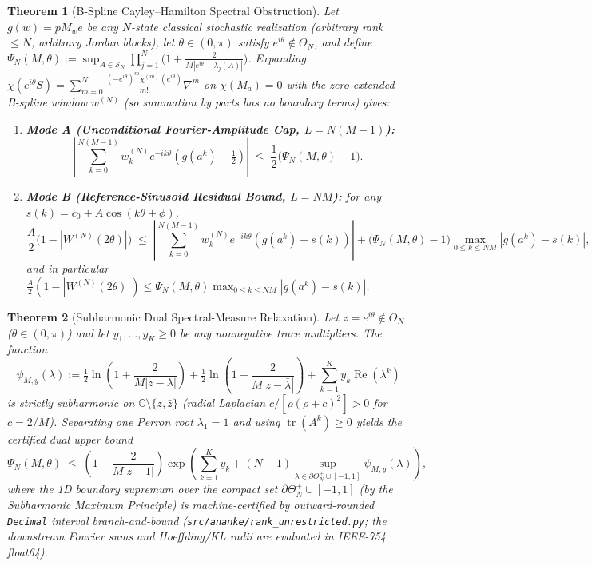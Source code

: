 \documentclass[11pt]{article}
\newtheorem{theorem}{Theorem}
\theoremstyle{definition}
\newcommand{\C}{\mathbb{C}}
\newcommand{\Tr}{\operatorname{tr}}
\begin{document}
\begin{theorem}[B-Spline Cayley--Hamilton Spectral Obstruction]\label{thm:bspline}
Let $g(w)=pM_w e$ be \emph{any} $N$-state classical stochastic realization (arbitrary rank $\le N$, arbitrary Jordan blocks), let $\theta\in(0,\pi)$ satisfy $e^{i\theta}\notin\Theta_N$, and define $\Psi_N(M,\theta):=\sup_{A\in\mathcal{S}_N}\prod_{j=1}^N\bigl(1+\frac{2}{M|e^{i\theta}-\lambda_j(A)|}\bigr)$. Expanding $\chi(e^{i\theta}S)=\sum_{m=0}^N\frac{(-e^{i\theta})^m\chi^{(m)}(e^{i\theta})}{m!}\nabla^m$ on $\chi(M_a)=0$ with the zero-extended B-spline window $w^{(N)}$ (so summation by parts has no boundary terms) gives:
\begin{enumerate}
\item \textbf{Mode A (Unconditional Fourier-Amplitude Cap, $L=N(M-1)$):}
\[
 \left|\sum_{k=0}^{N(M-1)} w^{(N)}_k e^{-ik\theta}\!\left(g(a^k)-\tfrac{1}{2}\right)\right| \;\le\; \frac{1}{2}\bigl(\Psi_N(M,\theta)-1\bigr).
\]
\item \textbf{Mode B (Reference-Sinusoid Residual Bound, $L=NM$):} for any $s(k)=c_0+A\cos(k\theta+\phi)$,
\[
 \frac{A}{2}\bigl(1-|W^{(N)}(2\theta)|\bigr) \;\le\; \left|\sum_{k=0}^{N(M-1)}w^{(N)}_k e^{-ik\theta}(g(a^k)-s(k))\right| + \bigl(\Psi_N(M,\theta)-1\bigr)\max_{0\le k\le NM}|g(a^k)-s(k)|,
\]
and in particular $\frac{A}{2}(1-|W^{(N)}(2\theta)|)\le \Psi_N(M,\theta)\max_{0\le k\le NM}|g(a^k)-s(k)|$.
\end{enumerate}
\end{theorem}

\begin{theorem}[Subharmonic Dual Spectral-Measure Relaxation]\label{thm:subharm}
Let $z=e^{i\theta}\notin\Theta_N$ ($\theta\in(0,\pi)$) and let $y_1,\dots,y_K\ge 0$ be any nonnegative trace multipliers. The function
\[
 \psi_{M,y}(\lambda) := \tfrac{1}{2}\ln\!\left(1+\frac{2}{M|z-\lambda|}\right)+\tfrac{1}{2}\ln\!\left(1+\frac{2}{M|z-\bar{\lambda}|}\right)+\sum_{k=1}^K y_k\operatorname{Re}(\lambda^k)
\]
is strictly subharmonic on $\C\setminus\{z,\bar{z}\}$ (radial Laplacian $c/[\rho(\rho+c)^2]>0$ for $c=2/M$). Separating one Perron root $\lambda_1=1$ and using $\Tr(A^k)\ge 0$ yields the certified dual upper bound
\[
 \Psi_N(M,\theta) \;\le\; \left(1+\frac{2}{M|z-1|}\right)\exp\!\left(\sum_{k=1}^K y_k + (N-1)\sup_{\lambda\in\partial\Theta_N^+\cup[-1,1]}\psi_{M,y}(\lambda)\right),
\]
where the 1D boundary supremum over the compact set $\partial\Theta_N^+\cup[-1,1]$ (by the Subharmonic Maximum Principle) is machine-certified by outward-rounded \texttt{Decimal} interval branch-and-bound (\texttt{src/ananke/rank\_unrestricted.py}; the downstream Fourier sums and Hoeffding/KL radii are evaluated in IEEE-754 float64).
\end{theorem}
\end{document}
